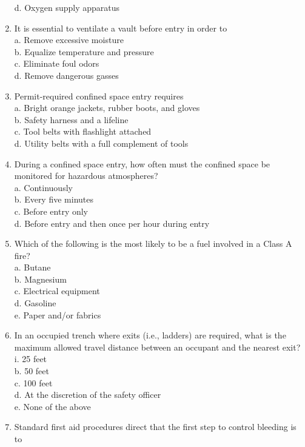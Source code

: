 \begin{enumerate}[1.]
d. Oxygen supply apparatus\\
\item It is essential to ventilate a vault before entry in order to\\
a. Remove excessive moisture\\
b. Equalize temperature and pressure\\
c. Eliminate foul odors\\
d. Remove dangerous gasses\\
\item Permit-required confined space entry requires\\
a. Bright orange jackets, rubber boots, and gloves\\
b. Safety harness and a lifeline\\
c. Tool belts with flashlight attached\\
d. Utility belts with a full complement of tools\\
\item During a confined space entry, how often must the confined space be monitored for hazardous atmospheres?\\
a. Continuously\\
b. Every five minutes\\
c. Before entry only\\
d. Before entry and then once per hour during entry\\
\item Which of the following is the most likely to be a fuel involved in a Class A fire?\\
a. Butane\\
b. Magnesium\\
c. Electrical equipment\\
d. Gasoline\\
e. Paper and/or fabrics\\
\item In an occupied trench where exits (i.e., ladders) are required, what is the maximum allowed travel distance between an occupant and the nearest exit?\\
i. 25 feet\\
b. 50 feet\\
c. 100 feet\\
d. At the discretion of the safety officer\\
e. None of the above\\
\item Standard first aid procedures direct that the first step to control bleeding is to\\

\end{enumerate}

